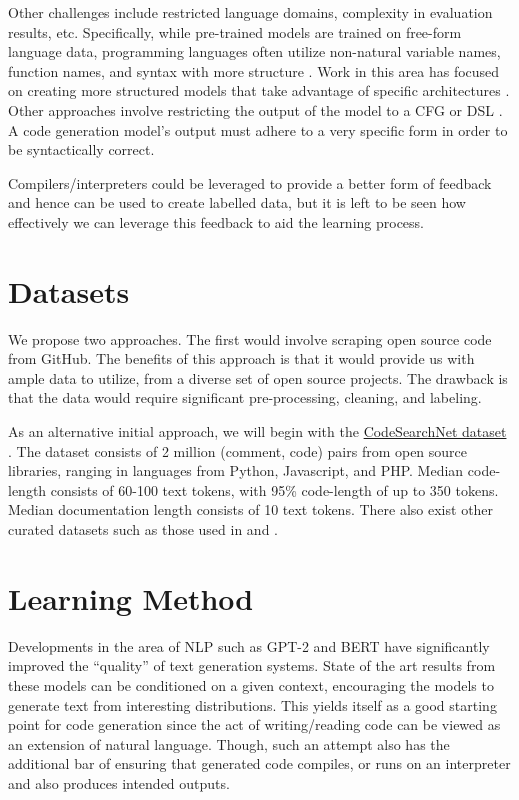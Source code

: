 \documentclass{article}
\begin{document}
Other challenges include restricted language domains, complexity in evaluation results, etc. Specifically, while pre-trained models are trained on free-form language data, programming languages often utilize non-natural variable names, function names, and syntax with more structure \cite{structural_code_modeling}. Work in this area has focused on creating more structured models that take advantage of specific architectures \cite{treegen}. Other approaches involve restricting the output of the model to a CFG or DSL \cite{grammar_based}. A code generation model’s output must adhere to a very specific form in order to be syntactically correct.

Compilers/interpreters could be leveraged to provide a better form of feedback and hence can be used to create labelled data, but it is left to be seen how effectively we can leverage this feedback to aid the learning process.

\section{Datasets}
We propose two approaches. The first would involve scraping open source code from GitHub. The benefits of this approach is that it would provide us with ample data to utilize, from a diverse set of open source projects. The drawback is that the data would require significant pre-processing, cleaning, and labeling.

As an alternative initial approach, we will begin with the \href{https://github.com/github/CodeSearchNet}{CodeSearchNet dataset} \cite{codesearchnet}. The dataset consists of 2 million (comment, code) pairs from open source libraries, ranging in languages from Python, Javascript, and PHP. Median code-length consists of 60-100 text tokens, with 95\% code-length of up to 350 tokens. Median documentation length consists of 10 text tokens. There also exist other curated datasets such as those used in \cite{latent_predictor_networks_for_code_generation} and \cite{learning_to_genereate_pseudo_code}.


\section{Learning Method}
Developments in the area of NLP such as GPT-2 \cite{gpt2} and BERT \cite{BERT} have significantly improved the “quality” of text generation systems. State of the art results from these models can be conditioned on a given context, encouraging the models to generate text from interesting distributions. This yields itself as a good starting point for code generation since the act of writing/reading code can be viewed as an extension of natural language. Though, such an attempt also has the additional bar of ensuring that generated code compiles, or runs on an interpreter and also produces intended outputs. 
\end{document}
